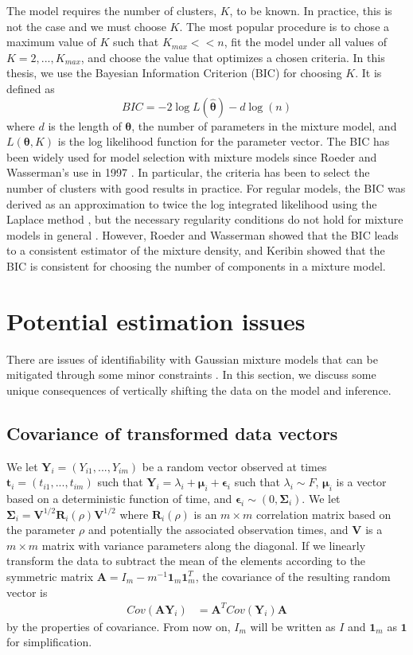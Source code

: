 \documentclass[12pt]{article}
\newcommand{\B}[0]{\mathbf}
\newcommand{\bs}[0]{\boldsymbol}
\begin{document}
The model requires the number of clusters, $K$, to be known. In practice, this is not the case and we must choose $K$. The most popular procedure is to chose a maximum value of $K$ such that $K_{max}<<n$, fit the model under all values of $K=2,...,K_{max}$, and choose the value that optimizes a chosen criteria. In this thesis, we use the Bayesian Information Criterion (BIC) \cite{schwarz1978} for choosing $K$. It is defined as
$$BIC = -2\log L(\hat{\bs\theta})- d\log(n)$$
where $d$ is the length of $\bs\theta$, the number of parameters in the mixture model, and $L(\bs\theta,K)$ is the log likelihood function for the parameter vector. The BIC has been widely used for model selection with mixture models since Roeder and Wasserman's use in 1997 \cite{roeder1997}. In particular, the criteria has been to select the number of clusters \cite{dasgupta1999,fraley1999} with good results in practice. For regular models, the BIC was derived as an approximation to twice the log integrated likelihood using the Laplace method \cite{tierney1986}, but the necessary regularity conditions do not hold for mixture models in general \cite{aitkin1985}. However, Roeder and Wasserman \cite{roeder1997} showed that the BIC leads to a consistent estimator of the mixture density, and Keribin \cite{keribin2000} showed that the BIC is consistent for choosing the number of components in a mixture model.

\section{Potential estimation issues}
There are issues of identifiability with Gaussian mixture models that can be mitigated through some minor constraints \cite{mclachlan2000}. In this section, we discuss some unique consequences of vertically shifting the data on the model and inference.

\subsection{Covariance of transformed data vectors}
We let $\B Y_{i}=(Y_{i1},...,Y_{im})$ be a random vector observed at times $\B t_{i}=(t_{i1},...,t_{im})$ such that
$\B Y_{i} = \lambda_{i} + \bs\mu_{i} + \bs\epsilon_{i}$
such that $\lambda_{i}\sim F$, $\bs\mu_{i}$ is a vector based on a deterministic function of time, and $\bs\epsilon_{i}\sim(0,\bs\Sigma_{i})$. We let $\B\Sigma_{i} =\B V^{1/2}\B R_{i}(\rho)\B V^{1/2}$ where $\B R_{i}(\rho)$ is an $m\times m$ correlation matrix based on the parameter $\rho$ and potentially the associated observation times, and $\B V$ is a $m\times m$ matrix with variance parameters along the diagonal. If we linearly transform the data to subtract the mean of the elements according to the symmetric matrix $\B A = I_{m}-m^{-1}\B 1_{m}\B 1_{m}^{T}$, the covariance of the resulting random vector is
\begin{align*}
Cov(\B A\B Y_{i}) &= \B A^{T}Cov(\B Y_{i})\B A
\end{align*}
by the properties of covariance. From now on, $I_{m}$ will be written as $I$ and $\B 1_{m}$ as $\B 1$ for simplification.
\end{document}
